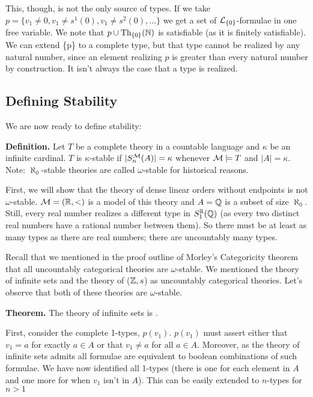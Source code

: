 This, though, is not the only source of types. 
If we take \(p = \{v_1 \neq 0, v_1 \neq s^1(0), v_1 \neq s^2(0), \ldots\}\) we get a set of \(\mathcal{L}_{\{0\}}\)-formulae in one free variable. 
We note that \(p \cup \text{Th}_{\{0\}}(\mathbb{N})\) is satisfiable (as it is finitely satisfiable). 
We can extend \{p\} to a complete type, but that type cannot be realized by any natural number, since an element realizing \(p\) is greater than every natural number by construction. 
It isn't always the case that a type is realized. 

\subsection{Defining Stability}

We are now ready to define stability: 

\textbf{Definition.} Let \(T\) be a complete theory in a countable language and \(\kappa\) be an infinite cardinal. 
\(T\) is \(\kappa\)-stable if \(|S_n^{\mathcal{M}}(A)| = \kappa\) whenever \(\mathcal{M} \models T\) and \(|A| = \kappa\). 
Note: \(\aleph_0\)-stable theories are called \(\omega\)-stable for historical reasons. 

First, we will show that the theory of dense linear orders without endpoints is not \(\omega\)-stable. 
\(\mathcal{M} = (\mathbb{R}, <)\) is a model of this theory and \(A = \mathbb{Q}\) is a subset of size \(\aleph_0\). 
Still, every real number realizes a different type in \(S_1^{\mathbb{R}}(\mathbb{Q})\) (as every two distinct real numbers have a rational number between them). 
So there must be at least as many types as there are real numbers; there are uncountably many types.  

Recall that we mentioned in the proof outline of Morley's Categoricity theorem that all uncountably categorical theories are \(\omega\)-stable. 
We mentioned the theory of infinite sets and the theory of (\(\mathbb{Z}, s\)) as uncountably categorical theories. 
Let's observe that both of these theories are \(\omega\)-stable. 

\textbf{Theorem.} The theory of infinite sets is \omst. 

First, consider the complete 1-types, \(p(v_1)\). \(p(v_1)\) must assert either that \(v_1 = a\) for exactly \(a \in A\) or that \(v_1 \neq a\) for all \(a \in A\). 
Moreover, as the theory of infinite sets admits \qe all formulae are equivalent to boolean combinations of such formulae. 
We have now identified all 1-types (there is one for each element in \(A\) and one more for when \(v_1\) isn't in \(A\)). 
This can be easily extended to \(n\)-types for \(n > 1\)

